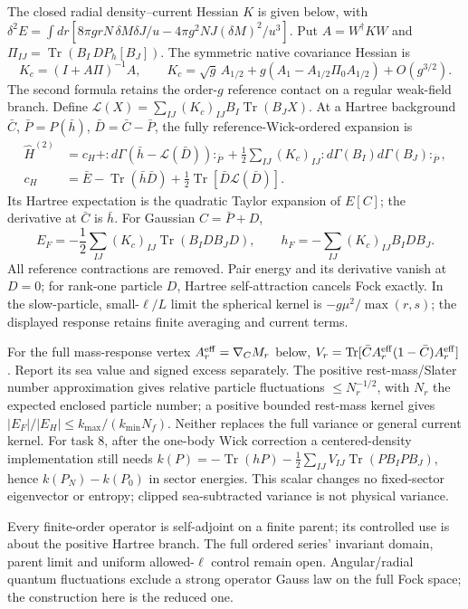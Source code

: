 The closed radial density--current Hessian $K$ is given below, with
$\delta^2E=\int dr[8\pi grN\,\delta M\delta J/u
-4\pi g^2NJ(\delta M)^2/u^3]$.
Put $A=W^\dagger K W$ and
$\Pi_{IJ}=\operatorname{Tr}(B_I\,DP_h[B_J])$.
The symmetric native covariance Hessian is
\[
 K_c=(I+A\Pi)^{-1}A,\qquad
 K_c=\sqrt g\,A_{1/2}
       +g(A_1-A_{1/2}\Pi_0A_{1/2})+O(g^{3/2}).
\]
The second formula retains the order-$g$ reference contact on a regular
weak-field branch. Define
$\mathcal L(X)=\sum_{IJ}(K_c)_{IJ}B_I\operatorname{Tr}(B_JX)$.
At a Hartree background $\bar C$, $\bar P=P(\bar h)$,
$\bar D=\bar C-\bar P$, the fully reference-Wick-ordered expansion is
\[
 \begin{aligned}
 \widehat H^{(2)}
 &=c_H+{:}d\Gamma(\bar h-\mathcal L(\bar D)){:}_{\bar P}
 +\frac12\sum_{IJ}(K_c)_{IJ}
       {:}d\Gamma(B_I)d\Gamma(B_J){:}_{\bar P},\\
 c_H&=\bar E-\operatorname{Tr}(\bar h\bar D)
           +\tfrac12\operatorname{Tr}[\bar D\mathcal L(\bar D)].
 \end{aligned}
\]
Its Hartree expectation is the quadratic Taylor expansion of $E[C]$;
the derivative at $\bar C$ is $\bar h$. For Gaussian $C=\bar P+D$,
\[
 E_F=-\frac12\sum_{IJ}(K_c)_{IJ}\operatorname{Tr}(B_IDB_JD),
 \qquad h_F=-\sum_{IJ}(K_c)_{IJ}B_IDB_J .
\]
All reference contractions are removed. Pair energy and its derivative
vanish at $D=0$; for rank-one particle $D$, Hartree self-attraction cancels
Fock exactly. In the slow-particle, small-$\ell/L$ limit the spherical
kernel is $-g\mu^2/\max(r,s)$; the displayed response retains finite
averaging and current terms.

For the full mass-response vertex $A_r^{\rm eff}=\nabla_C M_r$ below,
$V_r=\operatorname{Tr}[\bar C A_r^{\rm eff}(1-\bar C)A_r^{\rm eff}]$.
Report its sea value and signed excess separately.
The positive rest-mass/Slater number approximation gives relative
particle fluctuations $\leq N_r^{-1/2}$, with $N_r$ the expected
enclosed particle number; a positive bounded rest-mass kernel gives
$|E_F|/|E_H|\leq k_{\max}/(k_{\min}N_f)$.
Neither replaces the full variance or general current kernel.
For task 8, after the one-body Wick correction a centered-density
implementation still needs
$k(P)=-\operatorname{Tr}(hP)-\frac12\sum_{IJ}V_{IJ}
\operatorname{Tr}(PB_IPB_J)$, hence $k(P_N)-k(P_0)$ in sector energies.
This scalar changes no fixed-sector eigenvector or entropy; clipped
sea-subtracted variance is not physical variance.

Every finite-order operator is self-adjoint on a finite parent;
its controlled use is about the positive Hartree branch.
The full ordered series' invariant domain, parent limit and uniform
allowed-$\ell$ control remain open.
Angular/radial quantum fluctuations exclude a strong operator Gauss law
on the full Fock space; the construction here is the reduced one.

